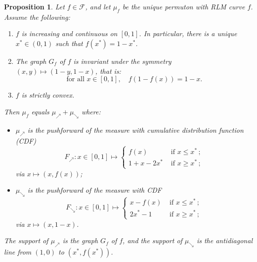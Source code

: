 \documentclass[a4paper,11pt]{amsart}
\newtheorem{prop}[thm]{Proposition}
\theoremstyle{definition}
\begin{document}
\begin{prop}\label{prop: support and density of 231 permuton}
    Let $f\in\mathcal{F}$, and let $\mu_f$ be the unique permuton with RLM curve $f$.
    Assume the following:
    \begin{enumerate}
        \item $f$ is increasing and continuous on $[0,1]$. 
        In particular, there is a unique $x^*\in(0,1)$ such that $f(x^*) = 1-x^*$.
        \item The graph $G_f$ of $f$ is invariant under the symmetry $(x,y) \mapsto (1-y, 1-x)$, that is: 
        \[ \text{for all } x\in[0,1],\quad f(1-f(x)) = 1-x .\]
        \item $f$ is strictly convex.
    \end{enumerate}
    Then $\mu_f$ equals $\mu_\nearrow + \mu_\searrow$ where:
    \begin{itemize}
        \item $\mu_\nearrow$ is the pushforward of the measure with cumulative distribution function (CDF) 
        \[ F_\nearrow : x\in[0,1] \mapsto \left\{
        \begin{array}{ll}
            f(x)
            &\text{ if } x\le x^* \,;\\
            1 + x- 2x^*
            &\text{ if } x\ge x^* \,;
        \end{array}
        \right. \]
        via $x\mapsto(x,f(x))$;
        \item $\mu_\searrow$ is the pushforward of the measure with CDF
        \[ F_\searrow : x\in[0,1] \mapsto \left\{
        \begin{array}{ll}
            x - f(x)
            &\text{ if } x\le x^* \,;\\
            2x^* - 1
            &\text{ if } x\ge x^* \,;
        \end{array}
        \right. \]
        via $x\mapsto(x,1-x)$.
    \end{itemize}
    The support of $\mu_\nearrow$ is the graph $G_f$ of $f$, and the support of $\mu_\searrow$ is the antidiagonal line from $(1,0)$ to $(x^*, f(x^*))$.
\end{prop}
\end{document}
